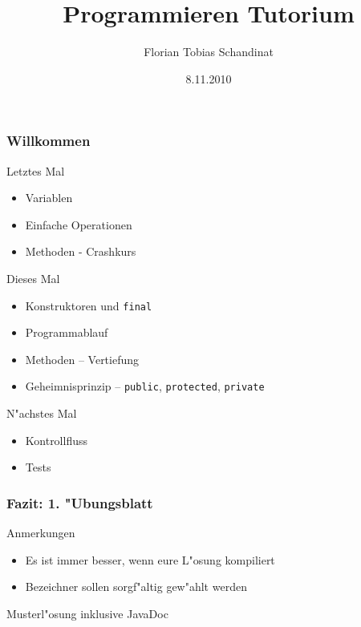 \documentclass{beamer}
\title{Programmieren Tutorium}
\author{Florian Tobias Schandinat}
\date{8.11.2010}
\institute{FTS}
\begin{document}
\begin{frame}
\frametitle{Willkommen}
\pause
\begin{alertblock}{Letztes Mal}
\begin{itemize}
\item Variablen\\
\item Einfache Operationen\\
\item Methoden - Crashkurs
\end{itemize}
\end{alertblock}

\pause

\begin{block}{Dieses Mal}
\begin{itemize}
\item Konstruktoren und \texttt{final}\\
\item Programmablauf\\
\item Methoden -- Vertiefung\\
\item Geheimnisprinzip -- \texttt{public}, \texttt{protected}, \texttt{private}
\end{itemize}
\end{block}

\pause

\begin{exampleblock}{N"achstes Mal}
\begin{itemize}
\item Kontrollfluss\\
\item Tests
\end{itemize}
\end{exampleblock}
\end{frame}


\begin{frame}
\frametitle{Fazit: 1. "Ubungsblatt}
\begin{block}{Anmerkungen}
\begin{itemize}
\item Es ist immer besser, wenn eure L"osung kompiliert
\item Bezeichner sollen sorgf"altig gew"ahlt werden
\end{itemize}
\end{block}

\pause

\begin{block}{Musterl"osung}
inklusive JavaDoc
\end{block}
\end{frame}
\end{document}

